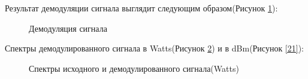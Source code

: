 \documentclass[a4paper,14pt]{extarticle}
\begin{document}
Результат демодуляции сигнала выглядит следующим образом(Рисунок \ref{19}):

\begin{figure}[H]
\caption{Демодуляция сигнала}
\label{19}
\end{figure}

Спектры демодулированного сигнала в Watts(Рисунок \ref{20}) и в dBm(Рисунок \ref{21}):

\begin{figure}[H]
\caption{Спектры исходного и демодулированного сигнала(Watts)}
\label{20}
\end{figure}
\end{document}
